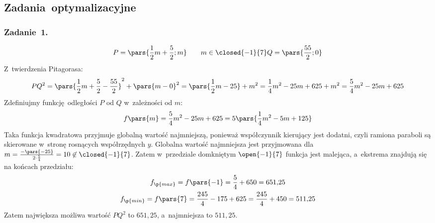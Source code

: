 \subsection*{Zadania~optymalizacyjne}
\subsubsection*{Zadanie~1.}
\begin{equation*}
    P = \pars{\frac{1}{2}m + \frac{5}{2}; m} \qquad m \in \closed{-1}{7}\\
    Q = \pars{\frac{55}{2}; 0}
\end{equation*}
Z~twierdzenia Pitagorasa:
\begin{equation*}
    PQ^2 = \pars{\frac{1}{2}m + \frac{5}{2} - \frac{55}{2}}^2 + \pars{m - 0}^2
        = \pars{\frac{1}{2}m - 25} + m^2
        = \frac{1}{4}m^2 - 25m + 625 + m^2
        = \frac{5}{4}m^2 - 25m + 625
\end{equation*}
Zdefiniujmy funkcję odległości \(P\) od \(Q\) w~zależności od \(m\):
\begin{equation*}
    f\pars{m} = \frac{5}{4}m^2 - 25m + 625
        = 5\pars{\frac{1}{4}m^2 - 5m + 125}
\end{equation*}
Taka funkcja kwadratowa przyjmuje globalną wartość najmniejszą, ponieważ współczynnik kierujący jest dodatni, czyli ramiona paraboli są skierowane w~stronę rosnących współrzędnych \(y\). Globalna wartość najmniejsza jest przyjmowana dla \(m = \frac{-\pars{-25}}{2 \cdot \frac{5}{4}} = 10 \not\in \closed{-1}{7}\). Zatem w~przedziale domkniętym \(\open{-1}{7}\) funkcja jest malejąca, a~ekstrema znajdują się na końcach przedziału:
\begin{gather*}
    f_\p{max} = f\pars{-1} = \frac{5}{4} + 650 = 651{,}25\\
    f_\p{min} = f\pars{7} = \frac{245}{4} - 175 + 625 = \frac{245}{4} + 450 = 511{,}25
\end{gather*}
Zatem największa możliwa wartość \(PQ^2\) to \(651{,}25\), a~najmniejsza to \(511{,}25\).

